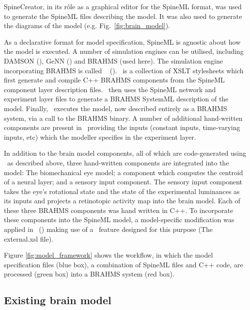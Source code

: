 \documentclass{frontiersSCNS}
\begin{document}
SpineCreator, in its r\^ole as a graphical editor for the SpineML
format, was used to generate the SpineML files describing the
model. It was also used to generate the diagrams of the model
(e.g. Fig.~\ref{fig:brain_model}).

As a declarative format for model specification, SpineML is agnostic
about how the model is executed. A number of simulation
engines can be utilised, including DAMSON (), GeNN
() and BRAHMS (used
here). The simulation engine incorporating BRAHMS is called \stob~
(). \stob~is a collection of XSLT
stylesheets which first generate and compile C++ BRAHMS components
from the SpineML component layer description files. \stob~then uses
the SpineML network and experiment layer files to generate a BRAHMS
SystemML description of the model. Finally, \stob~executes the model,
now described entirely as a BRAHMS system, via a call to the BRAHMS
binary. A number of additional hand-written components are present
in \stob~providing the inputs (constant inputs, time-varying inputs,
etc) which the modeller specifies in the experiment layer.

In addition to the brain model components, all of which are
code-generated using \stob~as described above, three hand-written
components are integrated into the model: The biomechanical eye model;
a component which computes the centroid of a neural layer; and a sensory input
component. The sensory input component takes the eye's rotational state and the
state of the experimental luminances as its inputs and projects a retinotopic
activity map into the brain model. Each of these three BRAHMS
components was hand written in C++. To incorporate these components
into the SpineML model, a model-specific modification was
applied in \stob~() making use of a \stob~feature designed for this purpose (The external.xsl file).


Figure \ref{fig:model_framework} shows the workflow, in which the model
specification files (blue box), a combination of SpineML files and C++
code, are processed (green box) into a BRAHMS system (red box).

\subsection{Existing brain model}
\end{document}
